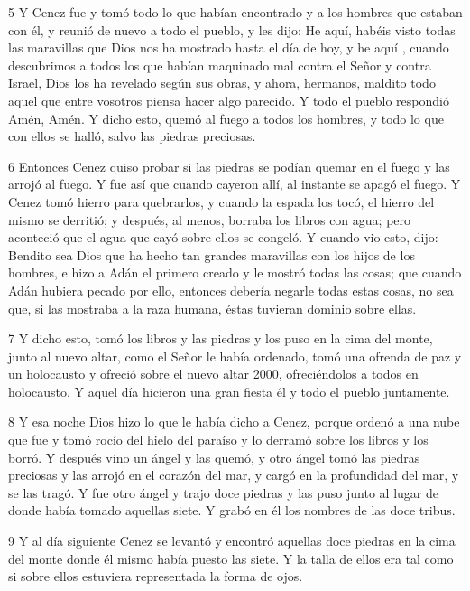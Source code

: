 \par 5 Y Cenez fue y tomó todo lo que habían encontrado y a los hombres que estaban con él, y reunió de nuevo a todo el pueblo, y les dijo: He aquí, habéis visto todas las maravillas que Dios nos ha mostrado hasta el día de hoy, y he aquí , cuando descubrimos a todos los que habían maquinado mal contra el Señor y contra Israel, Dios los ha revelado según sus obras, y ahora, hermanos, maldito todo aquel que entre vosotros piensa hacer algo parecido. Y todo el pueblo respondió Amén, Amén. Y dicho esto, quemó al fuego a todos los hombres, y todo lo que con ellos se halló, salvo las piedras preciosas.

\par 6 Entonces Cenez quiso probar si las piedras se podían quemar en el fuego y las arrojó al fuego. Y fue así que cuando cayeron allí, al instante se apagó el fuego. Y Cenez tomó hierro para quebrarlos, y cuando la espada los tocó, el hierro del mismo se derritió; y después, al menos, borraba los libros con agua; pero aconteció que el agua que cayó sobre ellos se congeló. Y cuando vio esto, dijo: Bendito sea Dios que ha hecho tan grandes maravillas con los hijos de los hombres, e hizo a Adán el primero creado y le mostró todas las cosas; que cuando Adán hubiera pecado por ello, entonces debería negarle todas estas cosas, no sea que, si las mostraba a la raza humana, éstas tuvieran dominio sobre ellas.

\par 7 Y dicho esto, tomó los libros y las piedras y los puso en la cima del monte, junto al nuevo altar, como el Señor le había ordenado, tomó una ofrenda de paz y un holocausto y ofreció sobre el nuevo altar 2000, ofreciéndolos a todos en holocausto. Y aquel día hicieron una gran fiesta él y todo el pueblo juntamente.

\par 8 Y esa noche Dios hizo lo que le había dicho a Cenez, porque ordenó a una nube que fue y tomó rocío del hielo del paraíso y lo derramó sobre los libros y los borró. Y después vino un ángel y las quemó, y otro ángel tomó las piedras preciosas y las arrojó en el corazón del mar, y cargó en la profundidad del mar, y se las tragó. Y fue otro ángel y trajo doce piedras y las puso junto al lugar de donde había tomado aquellas siete. Y grabó en él los nombres de las doce tribus.

\par 9 Y al día siguiente Cenez se levantó y encontró aquellas doce piedras en la cima del monte donde él mismo había puesto las siete. Y la talla de ellos era tal como si sobre ellos estuviera representada la forma de ojos.

